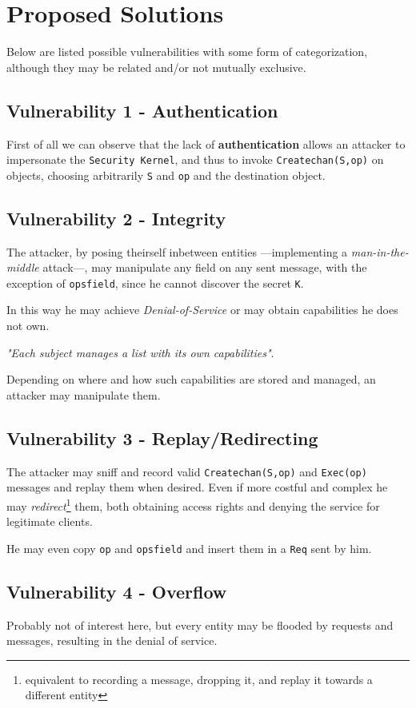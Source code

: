 \section{Proposed Solutions}
Below are listed possible vulnerabilities with some form of categorization,
although they may be related and/or not mutually exclusive.
\subsection{Vulnerability 1 - Authentication}

First of all we can observe that the lack of \textbf{authentication} allows an attacker to impersonate the \texttt{Security Kernel},
and thus to invoke \texttt{Createchan(S,op)} on objects, choosing arbitrarily \texttt{S} and \texttt{op} and the destination object.


\subsection{Vulnerability 2 - Integrity}
The attacker, by posing theirself inbetween entities {---}implementing a \textit{man-in-the-middle} attack{---},
may manipulate any field on any sent message,
with the exception of \texttt{opsfield}, since he cannot discover the secret \texttt{K}.

In this way he may achieve \textit{Denial-of-Service} or may obtain capabilities he does not own.
\nl

\begin{center}
   \textit{"Each subject manages a list with its own capabilities"}.
\end{center}
Depending on where and how such capabilities are stored and managed,
an attacker may manipulate them.

\subsection{Vulnerability 3 - Replay/Redirecting}

The attacker may sniff and record valid \texttt{Createchan(S,op)} and \texttt{Exec(op)} messages and replay them when desired.
Even if more costful and complex he may \textit{redirect}\footnote{equivalent to recording a message, dropping it, and replay it towards a different entity} them,
both obtaining access rights and denying the service for legitimate clients.

He may even copy \texttt{op} and \texttt{opsfield} and insert them in a \texttt{Req} sent by him.

\subsection{Vulnerability 4 - Overflow}

Probably not of interest here,
but every entity may be flooded by requests and messages,
resulting in the denial of service.